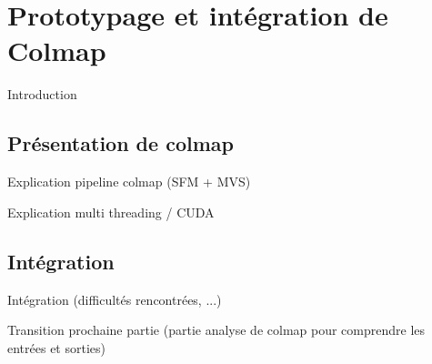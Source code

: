 \chapter{Prototypage et intégration de Colmap}

Introduction

\section{Présentation de colmap}

Explication pipeline colmap (SFM + MVS)

Explication multi threading / CUDA 

\section{Intégration}

Intégration (difficultés rencontrées, ...)

Transition prochaine partie (partie analyse de colmap pour comprendre les entrées et sorties)

